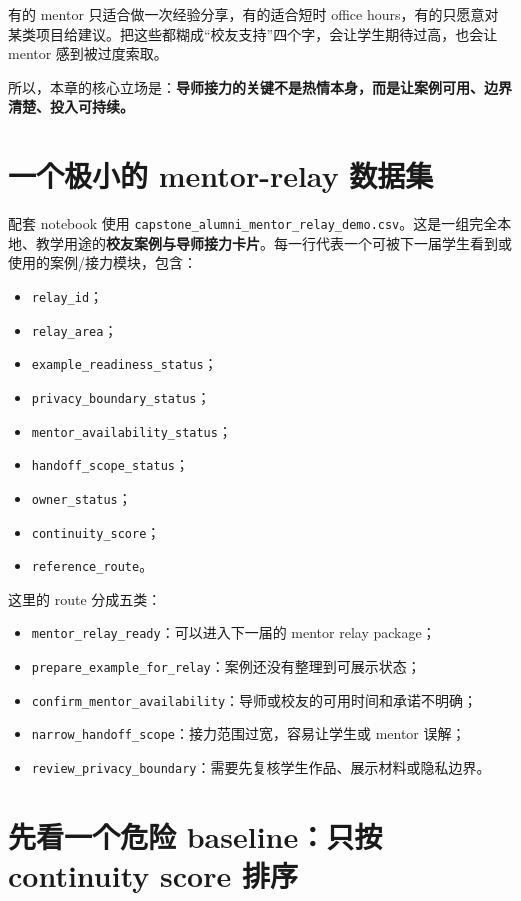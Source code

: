 有的 mentor 只适合做一次经验分享，有的适合短时 office hours，有的只愿意对某类项目给建议。把这些都糊成“校友支持”四个字，会让学生期待过高，也会让 mentor 感到被过度索取。

所以，本章的核心立场是：\textbf{导师接力的关键不是热情本身，而是让案例可用、边界清楚、投入可持续。}

\section{一个极小的 mentor-relay 数据集}

配套 notebook 使用 \nolinkurl{capstone_alumni_mentor_relay_demo.csv}。这是一组完全本地、教学用途的\textbf{校友案例与导师接力卡片}。每一行代表一个可被下一届学生看到或使用的案例/接力模块，包含：

\begin{itemize}
    \item \texttt{relay\_id}；
    \item \texttt{relay\_area}；
    \item \texttt{example\_readiness\_status}；
    \item \texttt{privacy\_boundary\_status}；
    \item \texttt{mentor\_availability\_status}；
    \item \texttt{handoff\_scope\_status}；
    \item \texttt{owner\_status}；
    \item \texttt{continuity\_score}；
    \item \texttt{reference\_route}。
\end{itemize}

这里的 route 分成五类：

\begin{itemize}
    \item \texttt{mentor\_relay\_ready}：可以进入下一届的 mentor relay package；
    \item \texttt{prepare\_example\_for\_relay}：案例还没有整理到可展示状态；
    \item \texttt{confirm\_mentor\_availability}：导师或校友的可用时间和承诺不明确；
    \item \texttt{narrow\_handoff\_scope}：接力范围过宽，容易让学生或 mentor 误解；
    \item \texttt{review\_privacy\_boundary}：需要先复核学生作品、展示材料或隐私边界。
\end{itemize}

\section{先看一个危险 baseline：只按 continuity score 排序}

